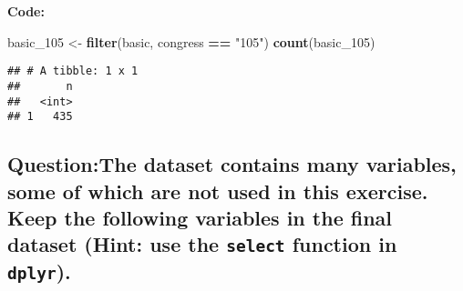 \documentclass[
]{article}
\newenvironment{Shaded}{\begin{snugshade}}{\end{snugshade}}
\newcommand{\FunctionTok}[1]{\textcolor[rgb]{0.13,0.29,0.53}{\textbf{#1}}}
\newcommand{\NormalTok}[1]{#1}
\newcommand{\OtherTok}[1]{\textcolor[rgb]{0.56,0.35,0.01}{#1}}
\newcommand{\SpecialCharTok}[1]{\textcolor[rgb]{0.81,0.36,0.00}{\textbf{#1}}}
\newcommand{\StringTok}[1]{\textcolor[rgb]{0.31,0.60,0.02}{#1}}
\begin{document}
\textbf{Code:}

\begin{Shaded}
\begin{Highlighting}[]
\NormalTok{basic\_105 }\OtherTok{\textless{}{-}} \FunctionTok{filter}\NormalTok{(basic, congress }\SpecialCharTok{==} \StringTok{"105"}\NormalTok{)}
\FunctionTok{count}\NormalTok{(basic\_105)}
\end{Highlighting}
\end{Shaded}

\begin{verbatim}
## # A tibble: 1 x 1
##       n
##   <int>
## 1   435
\end{verbatim}

\clearpage

\hypertarget{questionthe-dataset-contains-many-variables-some-of-which-are-not-used-in-this-exercise.-keep-the-following-variables-in-the-final-dataset-hint-use-the-select-function-in-dplyr.}{%
\subsection{\texorpdfstring{Question:The dataset contains many
variables, some of which are not used in this exercise. Keep the
following variables in the final dataset (Hint: use the \texttt{select}
function in
\texttt{dplyr}).}{Question:The dataset contains many variables, some of which are not used in this exercise. Keep the following variables in the final dataset (Hint: use the select function in dplyr).}}\label{questionthe-dataset-contains-many-variables-some-of-which-are-not-used-in-this-exercise.-keep-the-following-variables-in-the-final-dataset-hint-use-the-select-function-in-dplyr.}}
\end{document}
